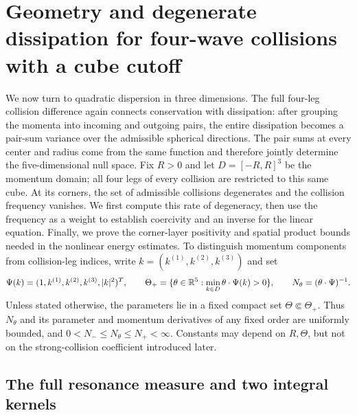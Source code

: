\section{Geometry and degenerate dissipation for four-wave collisions with a cube cutoff}\label{geom:section}

We now turn to quadratic dispersion in three dimensions. The full four-leg collision
difference again connects conservation with dissipation: after grouping the momenta
into incoming and outgoing pairs, the entire dissipation becomes a pair-sum variance
over the admissible spherical directions. The pair sums at every center and radius
come from the same function and therefore jointly determine the five-dimensional
null space. Fix $R>0$ and let $D=[-R,R]^3$ be the momentum domain; all four legs
of every collision are restricted to this same cube. At its corners, the set of
admissible collisions degenerates and the collision frequency vanishes. We first
compute this rate of degeneracy, then use the frequency as a weight to establish
coercivity and an inverse for the linear equation. Finally, we prove the corner-layer
positivity and spatial product bounds needed in the nonlinear energy estimates.
To distinguish momentum components from collision-leg indices, write
$k=(k^{(1)},k^{(2)},k^{(3)})$ and set
\[
 \Psi(k)=(1,k^{(1)},k^{(2)},k^{(3)},|k|^2)^T,\qquad
 \Theta_+=\{\theta\in\mathbb R^5:\min_{k\in D}\theta\cdot\Psi(k)>0\},
 \qquad N_\theta=(\theta\cdot\Psi)^{-1}.
\]
Unless stated otherwise, the parameters lie in a fixed compact set
$\Theta\Subset\Theta_+$. Thus $N_\theta$ and its parameter and momentum
derivatives of any fixed order are uniformly bounded, and
$0<N_-\le N_\theta\le N_+<\infty$. Constants may depend on $R,\Theta$,
but not on the strong-collision coefficient introduced later.

\subsection{The full resonance measure and two integral kernels}

